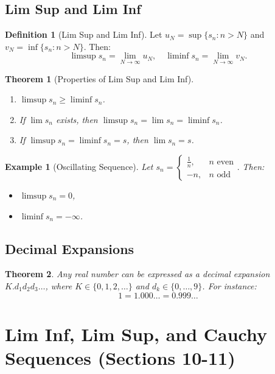 \documentclass[9pt]{article}
\theoremstyle{definition}
\newtheorem{definition}{Definition}
\theoremstyle{plain}
\newtheorem{theorem}{Theorem}
\newtheorem{example}{Example}
\begin{document}
\subsection*{Lim Sup and Lim Inf}
\begin{definition}[Lim Sup and Lim Inf]
Let \( u_N = \sup\{s_n : n > N\} \) and \( v_N = \inf\{s_n : n > N\} \). Then:
\[
\limsup s_n = \lim_{N \to \infty} u_N, \quad \liminf s_n = \lim_{N \to \infty} v_N.
\]
\end{definition}

\begin{theorem}[Properties of Lim Sup and Lim Inf]
\leavevmode
\begin{enumerate}
    \item \( \limsup s_n \geq \liminf s_n \).
    \item If \( \lim s_n \) exists, then \( \limsup s_n = \lim s_n = \liminf s_n \).
    \item If \( \limsup s_n = \liminf s_n = s \), then \( \lim s_n = s \).
\end{enumerate}
\end{theorem}

\begin{example}[Oscillating Sequence]
Let \( s_n = 
\begin{cases} 
\frac{1}{n}, & n \text{ even} \\
-n, & n \text{ odd}
\end{cases}.
\)
Then:
\begin{itemize}
    \item \( \limsup s_n = 0 \),
    \item \( \liminf s_n = -\infty \).
\end{itemize}
\end{example}

\subsection*{Decimal Expansions}
\begin{theorem}
Any real number can be expressed as a decimal expansion \( K.d_1d_2d_3\ldots \), where \( K \in \{0, 1, 2, \dots \} \) and \( d_k \in \{0, \ldots, 9\} \). For instance:
\[
1 = 1.000\ldots = 0.999\ldots
\]
\end{theorem}
\section*{Lim Inf, Lim Sup, and Cauchy Sequences (Sections 10-11)}
\end{document}
